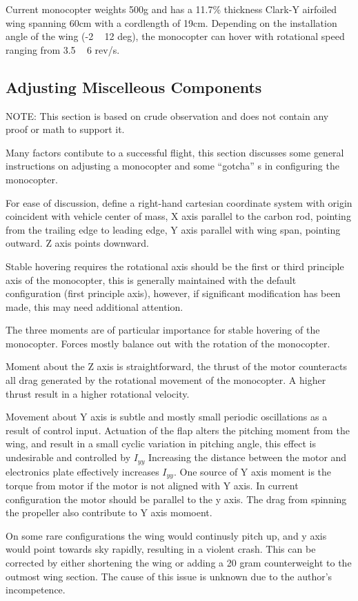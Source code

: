 \documentclass[12pt]{article}
\begin{document}
Current monocopter weights 500g and has a 11.7\% thickness Clark-Y airfoiled wing spanning 60cm with a cordlength of 19cm.
Depending on the installation angle of the wing (-2 ~ 12 deg), the monocopter can hover with rotational speed ranging from 3.5 ~ 6 rev/s. 


\subsection{Adjusting Miscelleous Components}
NOTE: This section is based on crude observation and does not contain any proof or math to support it.

Many factors contibute to a successful flight, this section discusses some general instructions on adjusting a monocopter and some ``gotcha'' s in configuring the monocopter.

For ease of discussion, define a right-hand cartesian coordinate system with origin coincident with vehicle center of mass, X axis parallel to the carbon rod, pointing from the trailing edge to leading edge, Y axis parallel with wing span, pointing outward. Z axis points downward.

Stable hovering requires the rotational axis should be the first or third principle axis of the monocopter, this is generally maintained with the default configuration (first principle axis), however, if significant modification has been made, this may need additional attention.

The three moments are of particular importance for stable hovering of the monocopter. Forces mostly balance out with the rotation of the monocopter.

Moment about the Z axis is straightforward, the thrust of the motor counteracts all drag generated by the rotational movement of the monocopter. A higher thrust result in a higher rotational velocity.

Movement about Y axis is subtle and mostly small periodic oscillations as a result of control input. Actuation of the flap alters the pitching moment from the wing, and result in a small cyclic variation in pitching angle, this effect is undesirable and controlled by $I_{yy}$ Increasing the distance between the motor and electronics plate effectively increases $I_{yy}$. 
One source of Y axis moment is the torque from motor if the motor is not aligned with Y axis. In current configuration the motor should be parallel to the y axis. The drag from spinning the propeller also contribute to Y axis momoent.

On some rare configurations the wing would continusly pitch up, and y axis would point towards sky rapidly, resulting in a violent crash. This can be corrected by either shortening the wing or adding a 20 gram counterweight to the outmost wing section. The cause of this issue is unknown due to the author's incompetence. 
\end{document}
